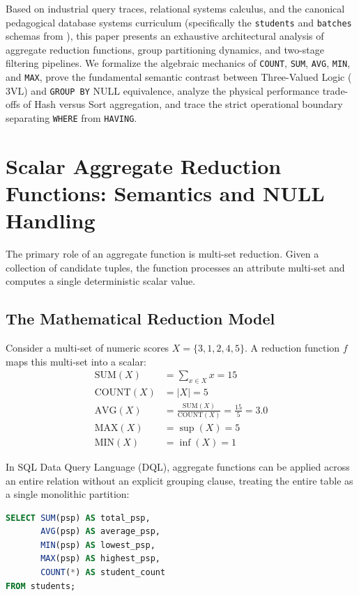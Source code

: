 \documentclass[10pt,twocolumn,letterpaper]{article}
\begin{document}
Based on industrial query traces, relational systems calculus, and the canonical pedagogical database systems curriculum (specifically the \texttt{students} and \texttt{batches} schemas from \cite{sql5lecture}), this paper presents an exhaustive architectural analysis of aggregate reduction functions, group partitioning dynamics, and two-stage filtering pipelines. We formalize the algebraic mechanics of \texttt{COUNT}, \texttt{SUM}, \texttt{AVG}, \texttt{MIN}, and \texttt{MAX}, prove the fundamental semantic contrast between Three-Valued Logic ($3\text{VL}$) and \texttt{GROUP BY} NULL equivalence, analyze the physical performance trade-offs of Hash versus Sort aggregation, and trace the strict operational boundary separating \texttt{WHERE} from \texttt{HAVING}.

\section{Scalar Aggregate Reduction Functions: Semantics and NULL Handling}
\label{sec:aggregate_functions}

The primary role of an aggregate function is multi-set reduction. Given a collection of candidate tuples, the function processes an attribute multi-set and computes a single deterministic scalar value.

\subsection{The Mathematical Reduction Model}
Consider a multi-set of numeric scores $X = \{3, 1, 2, 4, 5\}$. A reduction function $f$ maps this multi-set into a scalar:
\begin{align}
\text{SUM}(X) &= \sum_{x \in X} x = 15 \\
\text{COUNT}(X) &= |X| = 5 \\
\text{AVG}(X) &= \frac{\text{SUM}(X)}{\text{COUNT}(X)} = \frac{15}{5} = 3.0 \\
\text{MAX}(X) &= \sup(X) = 5 \\
\text{MIN}(X) &= \inf(X) = 1
\end{align}

In SQL Data Query Language (DQL), aggregate functions can be applied across an entire relation without an explicit grouping clause, treating the entire table as a single monolithic partition:
\begin{lstlisting}[language=SQL]
SELECT SUM(psp) AS total_psp, 
       AVG(psp) AS average_psp,
       MIN(psp) AS lowest_psp,
       MAX(psp) AS highest_psp,
       COUNT(*) AS student_count 
FROM students;
\end{lstlisting}
\end{document}
